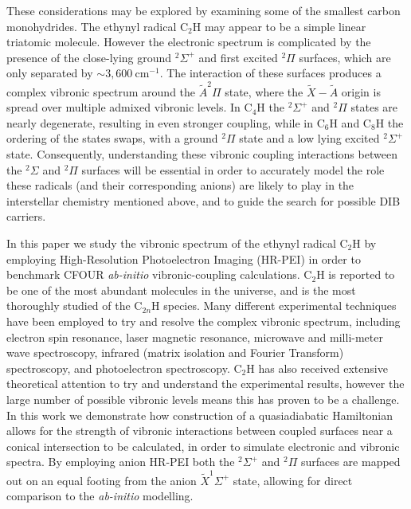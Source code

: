 \documentclass[journal=jpcafh,manuscript=article,layout=onecolumn, 12pt]{achemso}
\begin{document}
These considerations may be explored by examining some of the smallest carbon monohydrides. The ethynyl radical C$_2$H may appear to be a simple linear triatomic molecule. However the electronic spectrum is complicated by the presence of the close-lying ground $^2\Sigma^+$ and first excited $^2\Pi$ surfaces, which are only separated by $\sim3,600~$cm$^{-1}$. The interaction of these surfaces produces a complex vibronic spectrum around the $\tilde{A}^2\Pi$ state, where the $\tilde{X}-\tilde{A}$ origin is spread over multiple admixed vibronic levels. In C$_4$H the $^2\Sigma^+$ and $^2\Pi$ states are nearly degenerate, resulting in even stronger coupling, while in C$_6$H and C$_8$H the ordering of the states swaps, with a ground $^2\Pi$ state and a low lying excited $^2\Sigma^+$ state. Consequently, understanding these vibronic coupling interactions between the $^2\Sigma$ and $^2\Pi$ surfaces will be essential in order to accurately model the role these radicals (and their corresponding anions) are likely to play in the interstellar chemistry mentioned above, and to guide the search for possible DIB carriers.

In this paper we study the vibronic spectrum of the ethynyl radical C$_2$H by employing High-Resolution Photoelectron Imaging (HR-PEI) in order to benchmark CFOUR \emph{ab-initio} vibronic-coupling calculations. C$_2$H is reported to be one of the most abundant molecules in the universe, and is the most thoroughly studied of the C$_{2n}$H species. Many different experimental techniques have been employed to try and resolve the complex vibronic spectrum, including electron spin resonance, laser magnetic resonance, microwave and milli-meter wave spectroscopy, infrared (matrix isolation and Fourier Transform) spectroscopy, and photoelectron spectroscopy. C$_2$H has also received extensive theoretical attention to try and understand the experimental results, however the large number of possible vibronic levels means this has proven to be a challenge. In this work we demonstrate how construction of a quasiadiabatic Hamiltonian allows for the strength of vibronic interactions between coupled surfaces near a conical intersection to be calculated, in order to simulate electronic and vibronic spectra. By employing anion HR-PEI both the $^2\Sigma^+$ and $^2\Pi$ surfaces are mapped out on an equal footing from the anion $\tilde{X}^1\Sigma^+$ state, allowing for direct comparison to the \emph{ab-initio} modelling.
\end{document}
